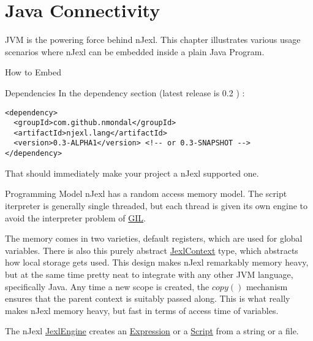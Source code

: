 \chapter{Java Connectivity}\label{java-connectivity}

{\LARGE J}VM is the powering force behind nJexl.
This chapter illustrates various usage scenarios where nJexl can be
embedded inside a plain Java Program.

\begin{section}{How to Embed}

\begin{subsection}{Dependencies}
In the dependency section (latest release is 0.2 ) : 
\begin{lstlisting}[style=XmlStyle]
<dependency>
  <groupId>com.github.nmondal</groupId>
  <artifactId>njexl.lang</artifactId>
  <version>0.3-ALPHA1</version> <!-- or 0.3-SNAPSHOT -->
</dependency>
\end{lstlisting}
That should immediately make your project a nJexl supported one. 
\end{subsection}

\begin{subsection}{Programming Model}
nJexl has a random access memory model.
The script iterpreter is generally single threaded,
but each thread is given its own engine to avoid
the interpreter problem of \href{https://en.wikipedia.org/wiki/Global\_interpreter\_lock}{GIL}.

The memory comes in two varieties, default registers, which are used for global variables.
There is also this purely abstract 
\href{https://github.com/nmondal/njexl/blob/master/lang/src/main/java/com/noga/njexl/lang/JexlContext.java}{JexlContext} type, 
which abstracts how local storage gets used. This design makes nJexl remarkably memory heavy,
but at the same time pretty neat to integrate with any other JVM language, specifically Java. 
Any time a new scope is created, the $copy()$ mechanism ensures that the parent context is suitably passed along.
This is what really makes nJexl memory heavy, but fast in terms of access time of variables.

The nJexl \href{https://github.com/nmondal/njexl/blob/master/lang/src/main/java/com/noga/njexl/lang/JexlEngine.java}{JexlEngine} 
creates an \href{https://github.com/nmondal/njexl/blob/master/lang/src/main/java/com/noga/njexl/lang/Expression.java}{Expression} 
or a \href{https://github.com/nmondal/njexl/blob/master/lang/src/main/java/com/noga/njexl/lang/Script.java}{Script} 
from a string or a file. 


\end{subsection}
\end{section}

